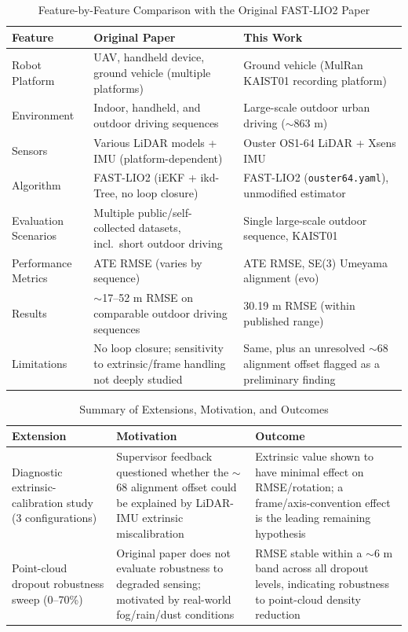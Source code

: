 \documentclass[conference]{IEEEtran}
\begin{document}
\begin{table}[htbp]
\caption{Feature-by-Feature Comparison with the Original FAST-LIO2 Paper}
\label{tab:comparison1}
\centering
\begin{tabular}{p{}p{}p{}}
\toprule
\textbf{Feature} & \textbf{Original Paper \cite{fastlio2}} & \textbf{This Work} \\
\midrule
Robot Platform & UAV, handheld device, ground vehicle (multiple platforms) & Ground vehicle (MulRan KAIST01 recording platform) \\
Environment & Indoor, handheld, and outdoor driving sequences & Large-scale outdoor urban driving ($\sim$863 m) \\
Sensors & Various LiDAR models + IMU (platform-dependent) & Ouster OS1-64 LiDAR + Xsens IMU \\
Algorithm & FAST-LIO2 (iEKF + ikd-Tree, no loop closure) & FAST-LIO2 (\texttt{ouster64.yaml}), unmodified estimator \\
Evaluation Scenarios & Multiple public/self-collected datasets, incl.\ short outdoor driving & Single large-scale outdoor sequence, KAIST01 \\
Performance Metrics & ATE RMSE (varies by sequence) & ATE RMSE, SE(3) Umeyama alignment (evo) \\
Results & $\sim$17--52 m RMSE on comparable outdoor driving sequences & 30.19 m RMSE (within published range) \\
Limitations & No loop closure; sensitivity to extrinsic/frame handling not deeply studied & Same, plus an unresolved $\sim$68\textdegree{} alignment offset flagged as a preliminary finding \\
\bottomrule
\end{tabular}
\end{table}

\begin{table}[htbp]
\caption{Summary of Extensions, Motivation, and Outcomes}
\label{tab:comparison2}
\centering
\begin{tabular}{p{}p{}p{}}
\toprule
\textbf{Extension} & \textbf{Motivation} & \textbf{Outcome} \\
\midrule
Diagnostic extrinsic-calibration study (3 configurations) & Supervisor feedback questioned whether the $\sim$68\textdegree{} alignment offset could be explained by LiDAR-IMU extrinsic miscalibration & Extrinsic value shown to have minimal effect on RMSE/rotation; a frame/axis-convention effect is the leading remaining hypothesis \\
Point-cloud dropout robustness sweep (0--70\%) & Original paper does not evaluate robustness to degraded sensing; motivated by real-world fog/rain/dust conditions & RMSE stable within a $\sim$6 m band across all dropout levels, indicating robustness to point-cloud density reduction \\
\bottomrule
\end{tabular}
\end{table}
\end{document}
